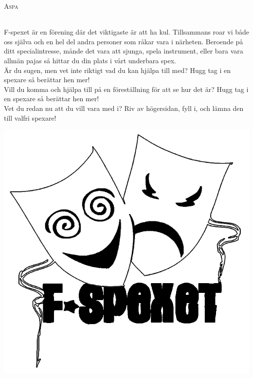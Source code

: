\setlength{\columnsep}{0.6cm}
\setlength{\columnseprule}{0.2pt}
\begin{multicols}{2}
    {\centerline{\Huge \textsc{Aspa}}}\leavevmode\\
    \noindent F-spexet är en förening där det viktigaste är att ha kul. Tillsammans roar vi både oss själva och en hel del andra personer som råkar vara i närheten. Beroende på ditt specialintresse, månde det vara att sjunga, spela instrument, eller bara vara allmän pajas så hittar du din plats i vårt underbara spex.\leavevmode\\
    
    \noindent Är du sugen, men vet inte riktigt vad du kan hjälpa till med? Hugg tag i en spexare så berättar hen mer!\leavevmode\\
    
    \noindent Vill du komma och hjälpa till på en föreställning för att se hur det är? Hugg tag i en spexare så berättar hen mer!\leavevmode\\
    
    \noindent Vet du redan nu att du vill vara med i? Riv av högersidan, fyll i, och lämna den till valfri spexare!

    \vspace*{\baselineskip}
    {\hfill }\vfill

    \centering
    \includegraphics[width=\columnwidth]{Spexloggaoifylld3.png}
    

\end{multicols}
